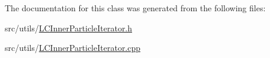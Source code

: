 The documentation for this class was generated from the following files\-:\begin{DoxyCompactItemize}
\item 
src/utils/\hyperlink{LCInnerParticleIterator_8h}{L\-C\-Inner\-Particle\-Iterator.\-h}\item 
src/utils/\hyperlink{LCInnerParticleIterator_8cpp}{L\-C\-Inner\-Particle\-Iterator.\-cpp}\end{DoxyCompactItemize}
